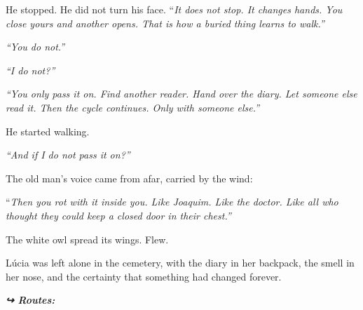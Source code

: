 \noindent He stopped. He did not turn his face.
\noindent \textquotedblleft{\textit{It does not stop. It changes hands. You close yours and another opens. That is how a buried thing learns to walk.\textquotedblright{}}}

\noindent \textit{\textquotedblleft{}You do not.\textquotedblright{}}

\noindent \textit{\textquotedblleft{}I do not?\textquotedblright{}}

\noindent \textit{\textquotedblleft{}You only pass it on. Find another reader. Hand over the diary. Let someone else read it. Then the cycle continues. Only with someone else.\textquotedblright{}}

\noindent He started walking.

\noindent \textit{\textquotedblleft{}And if I do not pass it on?\textquotedblright{}}

\noindent The old man's voice came from afar, carried by the wind:

\noindent \textquotedblleft{\textit{Then you rot with it inside you. Like Joaquim. Like the doctor. Like all who thought they could keep a closed door in their chest.\textquotedblright{}}}

\noindent The white owl spread its wings. Flew.

\noindent Lúcia was left alone in the cemetery, with the diary in her backpack, the smell in her nose, and the certainty that something had changed forever.

\vspace{0.5em}
\noindent\textit{\textbf{↪ Routes:}  \rotasep {}}
